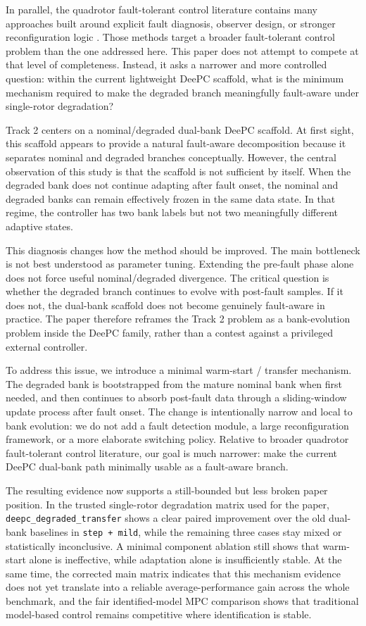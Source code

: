 \documentclass[12pt,a4paper]{article}
\begin{document}
In parallel, the quadrotor fault-tolerant control literature contains many approaches built around explicit fault diagnosis, observer design, or stronger reconfiguration logic \cite{sun2018singleRotor,guo2021faultDiagnosisFTC}. Those methods target a broader fault-tolerant control problem than the one addressed here. This paper does not attempt to compete at that level of completeness. Instead, it asks a narrower and more controlled question: within the current lightweight DeePC scaffold, what is the minimum mechanism required to make the degraded branch meaningfully fault-aware under single-rotor degradation?

Track 2 centers on a nominal/degraded dual-bank DeePC scaffold. At first sight, this scaffold appears to provide a natural fault-aware decomposition because it separates nominal and degraded branches conceptually. However, the central observation of this study is that the scaffold is not sufficient by itself. When the degraded bank does not continue adapting after fault onset, the nominal and degraded banks can remain effectively frozen in the same data state. In that regime, the controller has two bank labels but not two meaningfully different adaptive states.

This diagnosis changes how the method should be improved. The main bottleneck is not best understood as parameter tuning. Extending the pre-fault phase alone does not force useful nominal/degraded divergence. The critical question is whether the degraded branch continues to evolve with post-fault samples. If it does not, the dual-bank scaffold does not become genuinely fault-aware in practice. The paper therefore reframes the Track 2 problem as a bank-evolution problem inside the DeePC family, rather than a contest against a privileged external controller.

To address this issue, we introduce a minimal warm-start / transfer mechanism. The degraded bank is bootstrapped from the mature nominal bank when first needed, and then continues to absorb post-fault data through a sliding-window update process after fault onset. The change is intentionally narrow and local to bank evolution: we do not add a fault detection module, a large reconfiguration framework, or a more elaborate switching policy. Relative to broader quadrotor fault-tolerant control literature, our goal is much narrower: make the current DeePC dual-bank path minimally usable as a fault-aware branch.

The resulting evidence now supports a still-bounded but less broken paper position. In the trusted single-rotor degradation matrix used for the paper, \texttt{deepc\_degraded\_transfer} shows a clear paired improvement over the old dual-bank baselines in \texttt{step + mild}, while the remaining three cases stay mixed or statistically inconclusive. A minimal component ablation still shows that warm-start alone is ineffective, while adaptation alone is insufficiently stable. At the same time, the corrected main matrix indicates that this mechanism evidence does not yet translate into a reliable average-performance gain across the whole benchmark, and the fair identified-model MPC comparison shows that traditional model-based control remains competitive where identification is stable.
\end{document}
